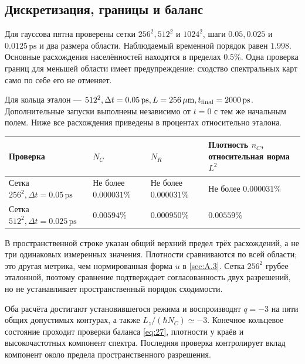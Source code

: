 \documentclass[12pt,a4paper]{article}
\begin{document}
\subsection{Дискретизация, границы и баланс}\label{sec:A.4}

Для гауссова пятна проверены сетки $256^{2}, 512^{2}$ и $1024^{2}$, шаги $0.05, 0.025$ и $0.0125\,\mathrm{ps}$ и два размера области. Наблюдаемый временной порядок равен $1.998$. Основные расхождения населённостей находятся в пределах $0.5\%$. Одна проверка границ для меньшей области имеет предупреждение: сходство спектральных карт само по себе его не отменяет.

Для кольца эталон --- $512^{2}, \Delta t=0.05\,\mathrm{ps}, L=256\,\mu\mathrm m, t_{\rm final}=2000\,\mathrm{ps}$. Дополнительные запуски выполнены независимо от $t=0$ с тем же начальным полем. Ниже все расхождения приведены в процентах относительно эталона.

\begin{center}\begin{tabular}{>{\raggedright\arraybackslash}p{}>{\raggedright\arraybackslash}p{}>{\raggedright\arraybackslash}p{}>{\raggedright\arraybackslash}p{}}\toprule

\textbf{Проверка} & \textbf{$N_{C}$} & \textbf{$N_{R}$} & \textbf{Плотность $n_{C}$, относительная норма $L^{2}$}\\\midrule

Сетка $256^{2}, \Delta t=0.05\,\mathrm{ps}$ & Не более $0.000031\%$ & Не более $0.000031\%$ & Не более $0.000031\%$\\

Сетка $512^{2}, \Delta t=0.025\,\mathrm{ps}$ & $0.00594\%$ & $0.000950\%$ & $0.00559\%$\\

\bottomrule\end{tabular}\end{center}

В пространственной строке указан общий верхний предел трёх расхождений, а не три одинаковых измеренных значения. Плотности сравниваются по всей области; это другая метрика, чем нормированная форма $u$ в \ref{sec:A.3}. Сетка $256^{2}$ грубее эталонной, поэтому сравнение подтверждает согласованность двух разрешений, но не устанавливает пространственный порядок сходимости.

Оба расчёта достигают установившегося режима и воспроизводят \mbox{$q=-3$} на пяти общих допустимых контурах, а также $L_{z}/(\hbar N_{C})\simeq -3$. Конечное кольцевое состояние проходит проверки баланса \eqref{eq:27}, плотности у краёв и высокочастотных компонент спектра. Последняя проверка контролирует вклад компонент около предела пространственного разрешения.
\end{document}
